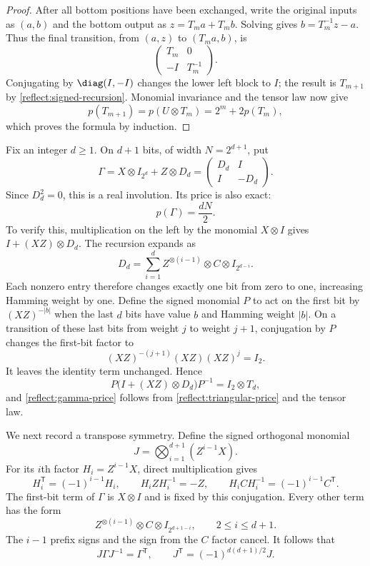 \begin{proof}
After all bottom positions have been exchanged, write the original
inputs as $(a,b)$ and the bottom output as $z=T_ma+T_mb$.
Solving gives $b=T_m^{-1}z-a$.  Thus the final transition, from $(a,z)$
to $(T_ma,b)$, is
\[
 \begin{pmatrix}T_m&0\\-I&T_m^{-1}\end{pmatrix}.
\]
Conjugating by $\diag(I,-I)$ changes the lower left block to $I$;
the result is $T_{m+1}$ by \eqref{reflect:signed-recursion}.
Monomial invariance and the tensor law now give
\[
 p(T_{m+1})=p(U\otimes T_m)=2^m+2p(T_m),
\]
which proves the formula by induction.
\end{proof}

Fix an integer $d\geq1$.  On $d+1$ bits, of width $N=2^{d+1}$, put
\begin{equation}
 \Gamma=X\otimes I_{2^d}+Z\otimes D_d
       =\begin{pmatrix}D_d&I\\I&-D_d\end{pmatrix}.
 \label{reflect:gamma}
\end{equation}
Since $D_d^2=0$, this is a real involution.  Its price is also exact:
\begin{equation}
 p(\Gamma)=\frac{dN}{2}.
 \label{reflect:gamma-price}
\end{equation}
To verify this, multiplication on the left by the monomial
$X\otimes I$ gives $I+(XZ)\otimes D_d$.
The recursion expands as
\[
 D_d=\sum_{i=1}^d
       Z^{\otimes(i-1)}\otimes C\otimes I_{2^{d-i}}.
\]
Each nonzero entry therefore changes exactly one bit from zero to one,
increasing Hamming weight by one.  Define the signed monomial $P$ to
act on the first bit by $(XZ)^{-|b|}$ when the last $d$ bits have value
$b$ and Hamming weight $|b|$.  On a transition of these last bits from
weight $j$ to weight $j+1$, conjugation by $P$ changes the first-bit
factor to
\[
 (XZ)^{-(j+1)}(XZ)(XZ)^j=I_2.
\]
It leaves the identity term unchanged.  Hence
\[
 P\bigl(I+(XZ)\otimes D_d\bigr)P^{-1}=I_2\otimes T_d,
\]
and \eqref{reflect:gamma-price} follows from
\cref{reflect:triangular-price} and the tensor law.

We next record a transpose symmetry.  Define the signed orthogonal
monomial
\begin{equation}
 J=\bigotimes_{i=1}^{d+1}(Z^{i-1}X).
 \label{reflect:j-definition}
\end{equation}
For its $i$th factor $H_i=Z^{i-1}X$, direct multiplication gives
\[
 H_i^{\mathsf T}=(-1)^{i-1}H_i,\qquad
 H_iZH_i^{-1}=-Z,\qquad
 H_iCH_i^{-1}=(-1)^{i-1}C^{\mathsf T}.
\]
The first-bit term of $\Gamma$ is $X\otimes I$ and is fixed by this
conjugation.  Every other term has the form
\[
 Z^{\otimes(i-1)}\otimes C\otimes I_{2^{d+1-i}},
 \qquad 2\leq i\leq d+1.
\]
The $i-1$ prefix signs and the sign from the $C$ factor cancel.  It
follows that
\begin{equation}
 J\Gamma J^{-1}=\Gamma^{\mathsf T},\qquad
 J^{\mathsf T}=(-1)^{d(d+1)/2}J.
 \label{reflect:transpose-symmetry}
\end{equation}

